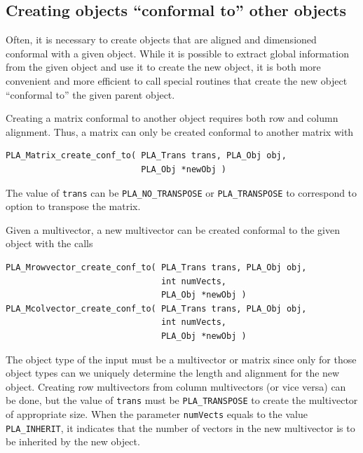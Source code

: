 \subsection{Creating objects ``conformal to'' other objects}

Often, it is necessary to create
objects that are aligned and dimensioned conformal with
a given object.  While it is possible to extract global
information from the given object and use it to create
the new object, it is both more convenient and more efficient
to call special routines that create the new object ``conformal to''
the given parent object.


Creating a matrix conformal to another object requires both
row and column alignment.  Thus, a matrix can only be created
conformal to another matrix with
\begin{FlaSpec}
\begin{verbatim}
PLA_Matrix_create_conf_to( PLA_Trans trans, PLA_Obj obj, 
                           PLA_Obj *newObj )
\end{verbatim}
\end{FlaSpec}
The value of {\tt trans} can be
{\tt PLA\_NO\_TRANSPOSE} or {\tt PLA\_TRANSPOSE}
to correspond to option to transpose the matrix.

Given a multivector, 
a new multivector can be created conformal to the
given object with the calls
\begin{FlaSpec}
\begin{verbatim}
PLA_Mrowvector_create_conf_to( PLA_Trans trans, PLA_Obj obj, 
                               int numVects,
                               PLA_Obj *newObj )
PLA_Mcolvector_create_conf_to( PLA_Trans trans, PLA_Obj obj, 
                               int numVects,
                               PLA_Obj *newObj )
\end{verbatim}
\end{FlaSpec}
The object type of the input must be a multivector or matrix
since only for those object types can we uniquely determine
the length and alignment for the new object.
Creating row multivectors from column multivectors (or vice versa)
can be done, but the value of {\tt trans} must be
{\tt PLA\_TRANSPOSE} to create the multivector of appropriate size.
When the parameter {\tt numVects} equals to the value
{\tt PLA\_INHERIT}, it indicates that the number of vectors in the
new multivector is to be inherited by the new object.


